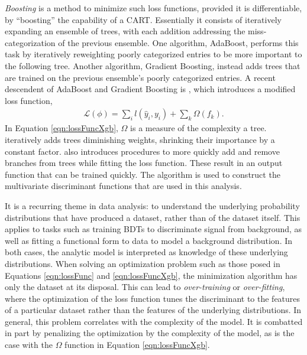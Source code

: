 \emph{Boosting} is a method to minimize such loss functions, provided it is differentiable, by ``boosting'' the capability of a CART.
Essentially it consists of iteratively expanding an ensemble of trees, with each addition addressing the miss-categorization of the previous ensemble.
One algorithm, AdaBoost, performs this task by iteratively reweighting poorly categorized entries to be more important to the following tree.
Another algorithm, Gradient Boosting, instead adds trees that are trained on the previous ensemble's poorly categorized entries.
A recent descendent of AdaBoost and Gradient Boosting is \xgb, which introduces a modified loss function,
\begin{equation}\begin{split}\label{eqn:lossFuncXgb}
    \mathcal{L}(\phi)=\sum_i l(\hat{y}_i,y_i)+\sum_k \Omega(f_k).
\end{split}\end{equation} 
In Equation \ref{eqn:lossFuncXgb}, $\Omega$ is a measure of the complexity a tree.
\xgb iteratively adds trees diminishing weights, shrinking their importance by a constant factor.
\xgb also introduces procedures to more quickly add and remove branches from trees while fitting the loss function.
These result in an output function that can be trained quickly.
The \xgb algorithm is used to construct the multivariate discriminant functions that are used in this analysis.
\cite{xgboost}

It is a recurring theme in data analysis: to understand the underlying probability distributions that have produced a dataset, rather than of the dataset itself.
This applies to tasks such as training BDTs to discriminate signal from background, as well as fitting a functional form to data to model a background distribution. 
In both cases, the analytic model is interpreted as knowledge of these underlying distributions.
When solving an optimization problem such as those posed in Equations \ref{eqn:lossFunc} and \ref{eqn:lossFuncXgb}, the minimization algorithm has only the dataset at its disposal.
This can lead to \emph{over-training} or \emph{over-fitting}, where the optimization of the loss function tunes the discriminant to the features of a particular dataset rather than the features of the underlying distributions.
In general, this problem correlates with the complexity of the model.
It is combatted in part by penalizing the optimization by the complexity of the model, as is the case with the $\Omega$ function in Equation \ref{eqn:lossFuncXgb}.

